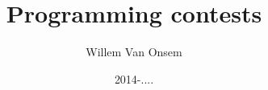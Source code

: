 \documentclass{../SharedData/programmingcontests}
\title{Programming contests}
\author{Willem Van Onsem}
\date{2014-....}
\begin{document}
\begin{titlepage}
\maketitle
\end{titlepage}
\tableofcontents\newpage

\end{document}
